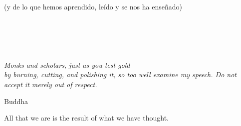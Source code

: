 \hfill (y de lo que hemos aprendido, le\'ido y se nos ha ense\~nado)


\fi


\ifdefined\inglese
{}
\section*{~}

\begin{center}
\scalebox{1.5}{To J \amper\ J}
\end{center}


\vspace{3cm}

\begin{center}
\it{Monks and scholars, just as you test gold\\
by burning, cutting, and polishing it,
so too well examine my speech.
Do not accept it merely out of respect.}
\end{center}

\hfill Buddha

\hfill All that we are is the result of what we have thought.
\fi

